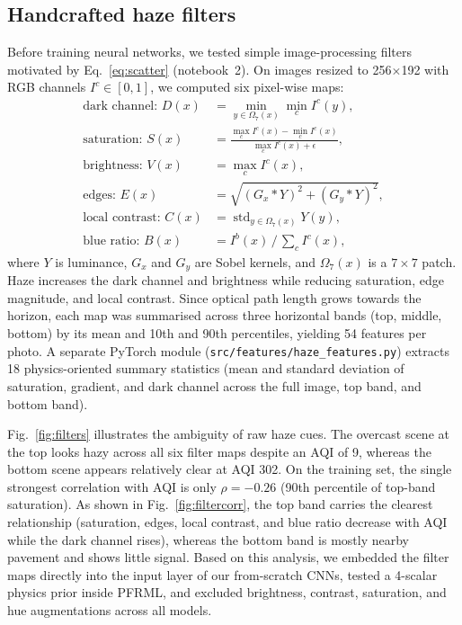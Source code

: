 \documentclass[conference]{IEEEtran}
\begin{document}
\subsection{Handcrafted haze filters}
Before training neural networks, we tested simple image-processing filters
motivated by Eq.~\eqref{eq:scatter} (notebook~2). On images resized to
256$\times$192 with RGB channels $I^c\in[0,1]$, we computed six pixel-wise maps:
\begin{align}
  \text{dark channel: } D(x) &= \min_{y\in\Omega_7(x)} \min_{c} I^c(y), \label{eq:dcp}\\
  \text{saturation: } S(x) &= \frac{\max_c I^c(x) - \min_c I^c(x)}{\max_c I^c(x) + \epsilon},\\
  \text{brightness: } V(x) &= \max_c I^c(x),\\
  \text{edges: } E(x) &= \sqrt{(G_x * Y)^2 + (G_y * Y)^2},\\
  \text{local contrast: } C(x) &= \operatorname{std}_{y\in\Omega_7(x)} Y(y),\\
  \text{blue ratio: } B(x) &= I^b(x) \,/\, \textstyle\sum_c I^c(x),
\end{align}
where $Y$ is luminance, $G_x$ and $G_y$ are Sobel kernels, and $\Omega_7(x)$ is
a $7\times7$ patch. Haze increases the dark channel and brightness while
reducing saturation, edge magnitude, and local contrast. Since optical path
length grows towards the horizon, each map was summarised across three
horizontal bands (top, middle, bottom) by its mean and 10th and 90th
percentiles, yielding 54 features per photo. A separate PyTorch module
(\texttt{src/features/haze\_features.py}) extracts 18 physics-oriented summary
statistics (mean and standard deviation of saturation, gradient, and dark
channel across the full image, top band, and bottom band).

Fig.~\ref{fig:filters} illustrates the ambiguity of raw haze cues. The overcast
scene at the top looks hazy across all six filter maps despite an AQI of 9,
whereas the bottom scene appears relatively clear at AQI 302. On the training
set, the single strongest correlation with AQI is only $\rho=-0.26$ (90th
percentile of top-band saturation). As shown in Fig.~\ref{fig:filtercorr}, the
top band carries the clearest relationship (saturation, edges, local contrast,
and blue ratio decrease with AQI while the dark channel rises), whereas the
bottom band is mostly nearby pavement and shows little signal. Based on this
analysis, we embedded the filter maps directly into the input layer of our
from-scratch CNNs, tested a 4-scalar physics prior inside PFRML, and excluded
brightness, contrast, saturation, and hue augmentations across all models.
\end{document}
